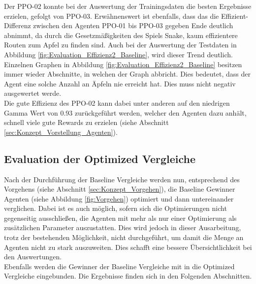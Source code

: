 Der PPO-02 konnte bei der Auswertung der Trainingsdaten die besten Ergebnisse erzielen, gefolgt von PPO-03.
Erwähnenswert ist ebenfalls, dass das die Effizient-Differenz zwischen den Agenten PPO-01 bis PPO-03 gegeben Ende deutlich abnimmt, da durch die Gesetzmäßigkeiten des Spiels Snake, kaum effizientere Routen zum Apfel zu finden sind.
Auch bei der Auswertung der Testdaten in Abbildung \ref{fig:Evaluation_Effizienz2_Baseline}, wird dieser Trend deutlich.\\
Einzelnen Graphen in Abbildung \ref{fig:Evaluation_Effizienz2_Baseline} besitzen immer wieder Abschnitte, in welchen der Graph abbricht. Dies bedeutet, dass der Agent eine solche Anzahl an Äpfeln nie erreicht hat. Dies muss nicht negativ ausgewertet werde.\\
Die gute Effizienz des PPO-02 kann dabei unter anderen auf den niedrigen Gamma Wert von 0.93 zurückgeführt werden, welcher den Agenten dazu anhält, schnell viele gute Rewards zu erzielen (siehe Abschnitt \ref{sec:Konzept_Vorstellung_Agenten}).

\subsection{Evaluation der Optimized Vergleiche}
Nach der Durchführung der Baseline Vergleiche werden nun, entsprechend des Vorgehens (siehe Abschnitt \ref{sec:Konzept_Vorgehen}), die Baseline Gewinner Agenten (siehe Abbildung \ref{fig:Vorgehen}) optimiert und dann untereinander verglichen.
Dabei ist es auch möglich, sofern sich die Optimierungen nicht gegenseitig ausschließen, die Agenten mit mehr als nur einer Optimierung als zusätzlichen Parameter auszustatten. Dies wird jedoch in dieser Ausarbeitung, trotz der bestehenden Möglichkeit, nicht durchgeführt, um damit die Menge an Agenten nicht zu stark auszuweiten. Dies schafft eine bessere Übersichtlichkeit bei den Auswertungen.\\
Ebenfalls werden die Gewinner der Baseline Vergleiche mit in die Optimized Vergleiche eingebunden. Die Ergebnisse finden sich in den Folgenden Abschnitten.

